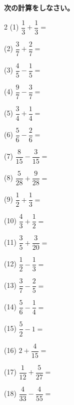 \documentclass[a4paper, 11pt]{ltjsarticle}
\begin{document}
\vspace*{2ex}

\noindent \textbf{次の計算をしなさい。}
\vspace*{2ex}

\begin{multicols*}{2}
\noindent (1) \quad $\dfrac{1}{3}+\dfrac{1}{3} =$ \vspace*{\fill}

\noindent (2) \quad $\dfrac{3}{7}+\dfrac{2}{7} =$ \vspace*{\fill}

\noindent (3) \quad $\dfrac{4}{5}-\dfrac{1}{5} =$ \vspace*{\fill}

\noindent (4) \quad $\dfrac{9}{7}-\dfrac{3}{7} =$ \vspace*{\fill}

\noindent (5) \quad $\dfrac{3}{4}+\dfrac{1}{4} =$ \vspace*{\fill}

\noindent (6) \quad $\dfrac{5}{6}-\dfrac{2}{6} =$ \vspace*{\fill}

\noindent (7) \quad $\dfrac{8}{15}-\dfrac{3}{15} =$ \vspace*{\fill}

\noindent (8) \quad $\dfrac{5}{28}+\dfrac{9}{28} =$ \vspace*{\fill}

\noindent (9) \quad $\dfrac{1}{2}+\dfrac{1}{3} =$ \vspace*{\fill}

\columnbreak
\noindent (10) \quad $\dfrac{4}{3}+\dfrac{1}{2} =$ \vspace*{\fill}

\noindent (11) \quad $\dfrac{3}{5}+\dfrac{3}{20} =$ \vspace*{\fill}

\noindent (12) \quad $\dfrac{1}{2}-\dfrac{1}{3} =$ \vspace*{\fill}

\noindent (13) \quad $\dfrac{3}{7}-\dfrac{2}{5} =$ \vspace*{\fill}

\noindent (14) \quad $\dfrac{5}{6}-\dfrac{1}{4} =$ \vspace*{\fill}

\noindent (15) \quad $\dfrac{5}{2}-1 =$ \vspace*{\fill}

\noindent (16) \quad $2+\dfrac{4}{15} =$ \vspace*{\fill}

\noindent (17) \quad $\dfrac{1}{12}+\dfrac{5}{27} =$ \vspace*{\fill}

\noindent (18) \quad $\dfrac{4}{33}-\dfrac{4}{55} =$ \vspace*{\fill}
\end{multicols*}
\end{document}
